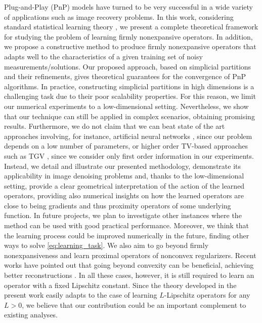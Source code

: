 \documentclass[onefignum,onetabnum]{siamonline250211}
\begin{document}
Plug-and-Play (PnP) models \cite{venkat2013} have turned to be very successful in a wide variety of applications such as image recovery problems. In this work, considering standard statistical learning theory \cite{cusma}, we present a complete theoretical framework for studying the problem of learning firmly nonexpansive operators. In addition, we propose a constructive method to produce firmly nonexpansive operators that adapts well to the characteristics of a given training set of noisy measurements/solutions. Our proposed approach, based on simplicial partitions and their refinements, gives theoretical guarantees for the convergence of PnP algorithms. In practice, constructing simplicial partitions in high dimensions is a challenging task due to their poor scalability properties. For this reason, we limit our numerical experiments to a low-dimensional setting. Nevertheless, we show that our technique can still be applied in complex scenarios, obtaining promising results. Furthermore, we do not claim that we can beat state of the art approaches involving, for instance, artificial neural networks \cite{Devalla2018,zhangIEEE,zhang}, since our problem depends on a low number of parameters, or higher order TV-based approaches such as TGV \cite{tgv}, since we consider only first order information in our experiments. Instead, we detail and illustrate our presented methodology, demonstrate its applicability in image denoising problems and, thanks to the low-dimensional setting, provide a clear geometrical interpretation of the action of the learned operators, providing also numerical insights on how the learned operators are close to being gradients and thus proximity operators of some underlying function. In future projects, we plan to investigate other instances where the method can be used with good practical performance. Moreover, we think that the learning process could be improved numerically in the future, finding other ways to solve \cref{eq:learning_task}. We also aim to go beyond firmly nonexpansiveness and learn proximal operators of nonconvex regularizers. Recent works have pointed out that going beyond convexity can be beneficial, achieving better reconstructions \cite{hurault22, ryupnp2019}. In all these cases, however, it is still required to learn an operator with a fixed Lipschitz constant. Since the theory developed in the present work easily adapts to the case of learning $L$-Lipschitz operators for any $L>0$, we believe that our contribution could be an important complement to existing analyses. 
\end{document}
